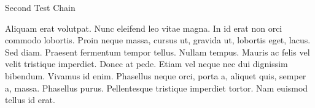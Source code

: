 \documentclass[class=article, crop=false]{standalone}
\begin{document}
\begin{eventchain}{Second Test Chain}
  \eventContinue
  \eventStart[5]
  \eventContinue
\end{eventchain}

Aliquam erat volutpat.  Nunc eleifend leo vitae magna.  In id erat non orci
commodo lobortis.  Proin neque massa, cursus ut, gravida ut, lobortis eget,
lacus.  Sed diam.  Praesent fermentum tempor tellus.  Nullam tempus.  Mauris ac
felis vel velit tristique imperdiet.  Donec at pede.  Etiam vel neque nec dui
dignissim bibendum.  Vivamus id enim.  Phasellus neque orci, porta a, aliquet
quis, semper a, massa.  Phasellus purus.  Pellentesque tristique imperdiet
tortor.  Nam euismod tellus id erat.



\IfStandalone{
  \nocite{*}
  
  
  }{}
\end{document}
